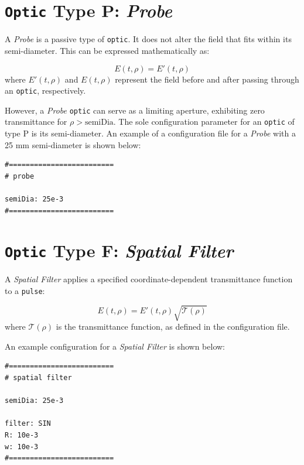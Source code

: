 \documentclass{report}
\begin{document}
\section{\texttt{Optic} Type P: \textit{Probe}}
A \textit{Probe} is a passive type of \texttt{optic}. It does not alter the field that fits within its semi-diameter. This can be expressed mathematically as:

\begin{equation}
E(t,\rho) = E'(t,\rho)
\end{equation}
where \( E'(t,\rho) \) and \( E(t,\rho) \) represent the field before and after passing through an \texttt{optic}, respectively.

However, a \textit{Probe} \texttt{optic} can serve as a limiting aperture, exhibiting zero transmittance for \( \rho > \text{semiDia} \). The sole configuration parameter for an \texttt{optic} of type P is its semi-diameter. An example of a configuration file for a \textit{Probe} with a 25 mm semi-diameter is shown below:

\begin{verbatim}
#=========================
# probe

semiDia: 25e-3
#=========================
\end{verbatim}


\section{\texttt{Optic} Type F: \textit{Spatial Filter}}
A \textit{Spatial Filter} applies a specified coordinate-dependent transmittance function to a \texttt{pulse}:

\begin{equation}
E(t,\rho) = E'(t,\rho) \sqrt{\mathcal{T}(\rho)}
\end{equation}
where \( \mathcal{T}(\rho) \) is the transmittance function, as defined in the configuration file.

An example configuration for a \textit{Spatial Filter} is shown below:

\begin{verbatim}
#=========================
# spatial filter

semiDia: 25e-3

filter: SIN
R: 10e-3
w: 10e-3
#=========================
\end{verbatim}
\end{document}
